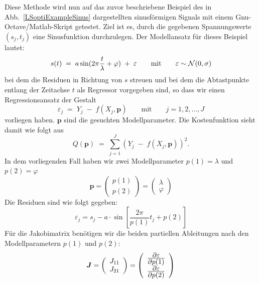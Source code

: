 Diese Methode wird nun auf das zuvor beschriebene Beispiel des in Abb.~\ref{LSoptiExampleSinus}
dargestellten sinusförmigen Signals mit einem Gnu-Octave/Matlab-Skript getestet.
Ziel ist es, durch die gegebenen Spannungswerte $(s_j,t_j)$ eine Sinusfunktion 
durchzulegen. Der Modellansatz für dieses Beispiel lautet:
\begin{equation}
	s(t) \; = \; a \sin(2\pi \frac{t}{\lambda} + \varphi) \; + \; \varepsilon \qquad 
	\textrm{mit} \qquad \varepsilon \sim {\cal N}(0,\sigma) 
\end{equation}
bei dem die Residuen in Richtung von $s$ streuen und bei dem die Abtastpunkte
entlang der Zeitachse $t$ als Regressor vorgegeben sind, so dass
wir einen Regressionsansatz der Gestalt
\begin{equation}
	\varepsilon_j \; = \; Y_j \; - \; f(X_j, \boldsymbol{p}) \qquad \textrm{mit} \qquad 
	j=1, 2,\dots, J 
\end{equation}
vorliegen haben. $\boldsymbol{p}$ sind die gesuchten Modellparameter. Die Kostenfunktion sieht damit wie folgt aus
\begin{equation}
	Q(\boldsymbol{p}) \; = \; \sum\limits_{j=1}^J \left(Y_j \; - \; f(X_j, \boldsymbol{p})\right)^2.
\end{equation}
In dem vorliegenden Fall haben wir zwei Modellparameter $p(1) = \lambda$ und $p(2) = \varphi$ 
\begin{equation}
\boldsymbol{p} =
\left(\begin{array}{c}
	p(1) \\
	p(2)
\end{array}\right)
= \left(\begin{array}{c}
	\lambda \\
	\varphi
\end{array}\right) 
\end{equation}
Die Residuen sind wie folgt gegeben: 
\begin{equation}
\varepsilon_j = s_j - a \cdot \sin \left[ \frac{2 \pi}{p(1)}t_j +p(2)\right]
\end{equation}
Für die Jakobimatrix benötigen wir die beiden partiellen Ableitungen nach den Modellparametern
$p(1)$ und $p(2)$: 
\begin{equation} \boldsymbol{J} = 
	\left(	\begin{array}{c} J_{11} \\ J_{21} \end{array}
	\right)
	= \left(
	\begin{array}{c}
		\frac{\displaystyle \partial \varepsilon}{\displaystyle \partial p(1)} \\
		\frac{\displaystyle \partial \varepsilon}{\displaystyle \partial p(2)}
	\end{array}
\right)
\end{equation}

